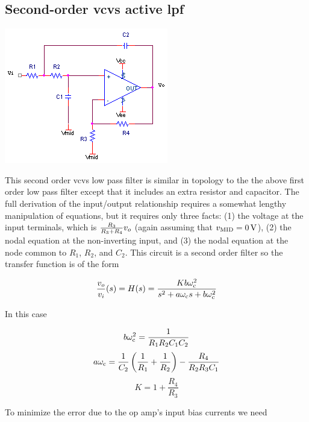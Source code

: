 \subsection{Second-order \acs{vcvs} active \acl{lpf}}
\begin{center}
	\includegraphics{schematics/2ndorder_vcvs_LPfilter.PNG}
\end{center}
This second order \ac{vcvs} low pass filter is similar in topology to the the above first order low pass filter except that it includes an extra resistor and capacitor.
The full derivation of the input/output relationship requires a somewhat lengthy manipulation of equations, but it requires only three facts: (1) the voltage at the input terminals, which is $\frac{R_3}{R_3 + R_4}\vout$ (again assuming that $v\sub{MID} = \SI{0}{\V}$), (2) the nodal equation at the non-inverting input, and (3) the nodal equation at the node common to $R_1$, $R_2$, and $C_2$.
This circuit is a second order filter so the transfer function is of the form

\textcolor{red}{
\begin{equation}
\frac{\vout}{\vin}(s) = \Hs = \frac{K b \wcutoff^2}{s^{2} + a\wcutoff s + b\wcutoff^2}
\label{eq:2ndorder_vcvs_LPfilter}
\end{equation}
}

In this case

\begin{equation}
b\omega_\mathrm{c}^2 = \frac{1}{R_1 R_2 C_1 C_2}
\end{equation}
\begin{equation}
a\omega_\mathrm{c} = \frac{1}{C_2}\left(\frac{1}{R_1} + \frac{1}{R_2}\right) - \frac{R_4}{R_2 R_3 C_1}
\end{equation}
\begin{equation}
K = 1 + \frac{R_4}{R_3}
\end{equation}

To minimize the error due to the op amp's input bias currents we need

